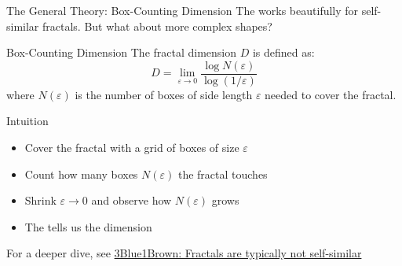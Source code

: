 \begin{frame}{The General Theory: Box-Counting Dimension}
  \small
  The  works beautifully for
  self-similar fractals. But what about more complex shapes?

  \vspace{0.3cm}
  \begin{mathbox}{Box-Counting Dimension}
    The fractal dimension $D$ is defined as:
    $$D = \lim_{\varepsilon \to 0}
      \frac{\log N(\varepsilon)}{\log(1/\varepsilon)}$$
    where $N(\varepsilon)$ is the number of boxes of side length
    $\varepsilon$ needed to cover the fractal.
  \end{mathbox}

  \vspace{0.3cm}
  \pause
  \begin{conceptbox}{Intuition}
    \begin{itemize}
      \item Cover the fractal with a grid of boxes of size
        $\varepsilon$
      \item Count how many boxes $N(\varepsilon)$ the fractal
        touches
      \item Shrink $\varepsilon \to 0$ and observe how
        $N(\varepsilon)$ grows
      \item The  tells us the
        dimension
    \end{itemize}
  \end{conceptbox}

  \vspace{0.2cm}
  \begin{center}
    {\footnotesize\color{DarkGray} For a deeper dive, see
    \href{https://www.youtube.com/watch?v=gB9n2gHsHN4}%
    {\textcolor{AccentColor}{3Blue1Brown:
    Fractals are typically not self-similar}}}
  \end{center}
\end{frame}

